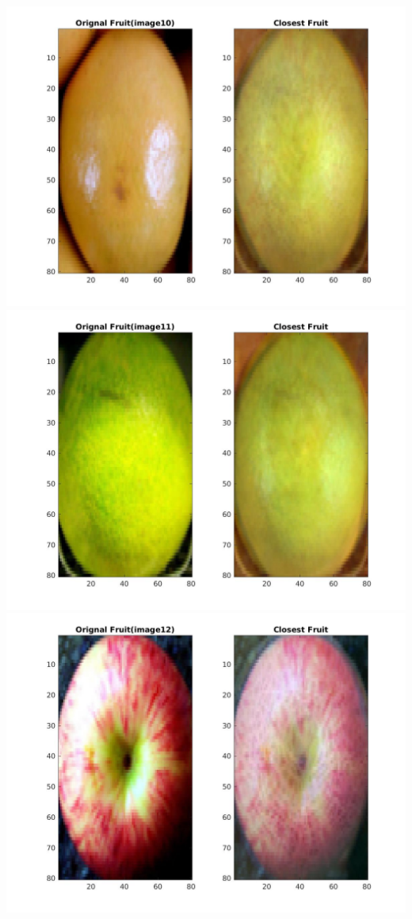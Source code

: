 \documentclass[12pt, a4paper]{article}
\begin{document}
\includegraphics[width=\textwidth, height = 0.25\paperheight]{Closest_fruit_analysis_10}
\includegraphics[width=\textwidth, height = 0.25\paperheight]{Closest_fruit_analysis_11}
\includegraphics[width=\textwidth, height = 0.25\paperheight]{Closest_fruit_analysis_12}
\end{document}

